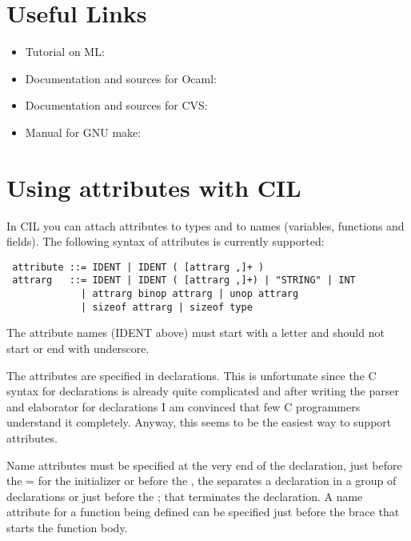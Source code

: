 \documentclass{book}
\begin{document}
\chapter{Useful Links}
\begin{itemize}
 \item  Tutorial on ML: 

        

  \item Documentation and sources for Ocaml: 

        

  \item Documentation and sources for CVS:

    

  \item Manual for GNU make:

    
 \end{itemize}

\chapter{Using attributes with CIL}

 In CIL you can attach attributes to types and to names (variables, functions
and fields). The following syntax of attributes is currently supported: 

\begin{verbatim}
 attribute ::= IDENT | IDENT ( [attrarg ,]+ )
 attrarg   ::= IDENT | IDENT ( [attrarg ,]+) | "STRING" | INT
             | attrarg binop attrarg | unop attrarg
             | sizeof attrarg | sizeof type
\end{verbatim}

 The attribute names (IDENT above) must start with a letter and should not
start or end with underscore.

 The attributes are specified in declarations. This is unfortunate since the C
syntax for declarations is already quite complicated and after writing the
parser and elaborator for declarations I am convinced that few C programmers
understand it completely. Anyway, this seems to be the easiest way to support
attributes. 

 Name attributes must be specified at the very end of the declaration, just
before the = for the initializer or before the , the separates a declaration
in a group of declarations or just before the ; that terminates the
declaration. A name attribute for a function being defined can be specified
just before the brace that starts the function body. 
\end{document}
